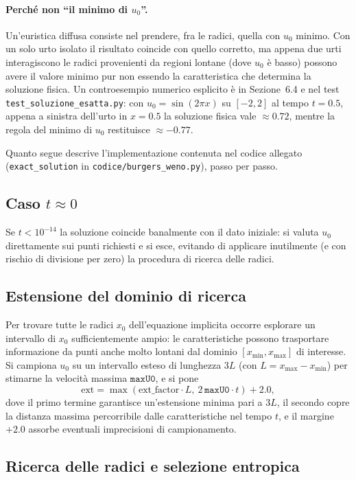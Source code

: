 \documentclass[12pt]{article}
\begin{document}
\paragraph{Perché non ``il minimo di $u_0$''.} Un'euristica diffusa consiste nel prendere, fra le radici, quella con $u_0$ minimo. Con un solo urto isolato il risultato coincide con quello corretto, ma appena due urti interagiscono le radici provenienti da regioni lontane (dove $u_0$ è basso) possono avere il valore minimo pur non essendo la caratteristica che determina la soluzione fisica. Un controesempio numerico esplicito è in Sezione~6.4 e nel test \texttt{test\_soluzione\_esatta.py}: con $u_0=\sin(2\pi x)$ su $[-2,2]$ al tempo $t=0.5$, appena a sinistra dell'urto in $x=0.5$ la soluzione fisica vale $\approx 0.72$, mentre la regola del minimo di $u_0$ restituisce $\approx -0.77$.

Quanto segue descrive l'implementazione contenuta nel codice allegato (\texttt{exact\_solution} in \texttt{codice/burgers\_weno.py}), passo per passo.

\subsection{Caso $t\approx0$}

Se $t<10^{-14}$ la soluzione coincide banalmente con il dato iniziale: si valuta $u_0$ direttamente sui punti richiesti e si esce, evitando di applicare inutilmente (e con rischio di divisione per zero) la procedura di ricerca delle radici.

\subsection{Estensione del dominio di ricerca}

Per trovare tutte le radici $x_0$ dell'equazione implicita occorre esplorare un intervallo di $x_0$ sufficientemente ampio: le caratteristiche possono trasportare informazione da punti anche molto lontani dal dominio $[x_{\min},x_{\max}]$ di interesse. Si campiona $u_0$ su un intervallo esteso di lunghezza $3L$ (con $L=x_{\max}-x_{\min}$) per stimarne la velocità massima $\texttt{maxU0}$, e si pone
\[
\text{ext} = \max(\text{ext\_factor}\cdot L,\ 2\,\texttt{maxU0}\cdot t) + 2.0,
\]
dove il primo termine garantisce un'estensione minima pari a $3L$, il secondo copre la distanza massima percorribile dalle caratteristiche nel tempo $t$, e il margine $+2.0$ assorbe eventuali imprecisioni di campionamento.

\subsection{Ricerca delle radici e selezione entropica}
\end{document}
